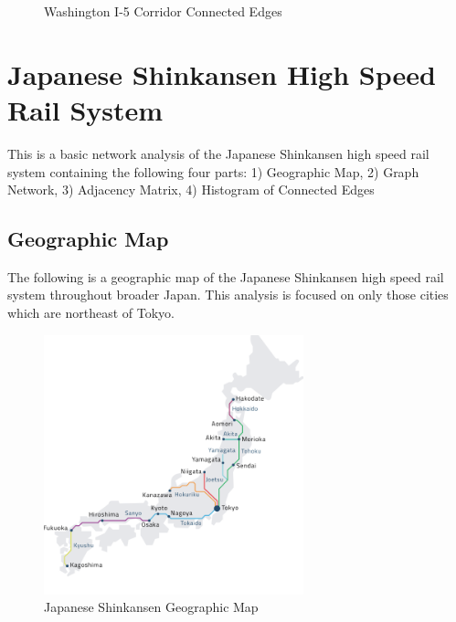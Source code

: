 \documentclass{article}
\begin{document}
    \begin{figure}[h]
    \centering
    \caption{Washington I-5 Corridor Connected Edges}
    \label{fig:plot}
    \end{figure}
    
\section*{Japanese Shinkansen High Speed Rail System}
This is a basic network analysis of the Japanese Shinkansen high speed rail system containing the following four parts: 1) Geographic Map, 2) Graph Network, 3) Adjacency Matrix, 4) Histogram of Connected Edges

\subsection*{Geographic Map}
The following is a geographic map of the Japanese Shinkansen high speed rail system throughout broader Japan. This analysis is focused on only those cities which are northeast of Tokyo. 
    \begin{figure}[h]
        \centering
        \includegraphics[width=0.67\textwidth]{jp_map.png}
        \caption{Japanese Shinkansen Geographic Map \cite{jrpass}}
        \label{fig:geomapjp}
    \end{figure}
\end{document}
